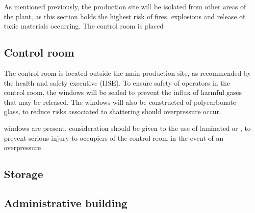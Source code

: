 As mentioned previously, the production site will be isolated from other areas of the plant, as this section holds the highest risk of fires, explosions  and release of toxic materials occurring. The control room is placed 

\subsection{Control room}

The control room is located outside the main production site, as recommended by the health and safety executive (HSE). To ensure safety of operators in the control room, the windows will be sealed to prevent the influx of harmful gases that may be released. The windows will also be constructed of polycarbonate glass, to reduce risks associated to shattering should overpressure occur.  

windows are present, consideration should be given to the use of laminated or , to prevent serious injury to occupiers of the control room in the event of an overpressure







\subsection{Storage}

\subsection{Administrative building}